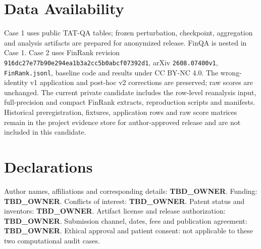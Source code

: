 \documentclass[10pt]{article}
\begin{document}
\section{Data Availability}
Case 1 uses public TAT-QA tables; frozen perturbation, checkpoint, aggregation and analysis artifacts are prepared for anonymized release. FinQA is nested in Case 1. Case 2 uses FinRank revision \texttt{916dc27e77b90e294ea1b3a2cc5b0abcf07392d1}, arXiv \texttt{2608.07400v1}, \texttt{FinRank.jsonl}, baseline code and results under CC BY-NC 4.0. The wrong-identity v1 application and post-hoc v2 corrections are preserved; raw scores are unchanged. The current private candidate includes the row-level reanalysis input, full-precision and compact FinRank extracts, reproduction scripts and manifests. Historical preregistration, fixtures, application rows and raw score matrices remain in the project evidence store for author-approved release and are not included in this candidate.
\section{Declarations}
Author names, affiliations and corresponding details: \textbf{TBD\_OWNER}.
Funding: \textbf{TBD\_OWNER}. Conflicts of interest: \textbf{TBD\_OWNER}.
Patent status and inventors: \textbf{TBD\_OWNER}. Artifact license and
release authorization: \textbf{TBD\_OWNER}. Submission channel, dates, fees
and publication agreement: \textbf{TBD\_OWNER}. Ethical approval and patient
consent: not applicable to these two computational audit cases.


\end{document}
